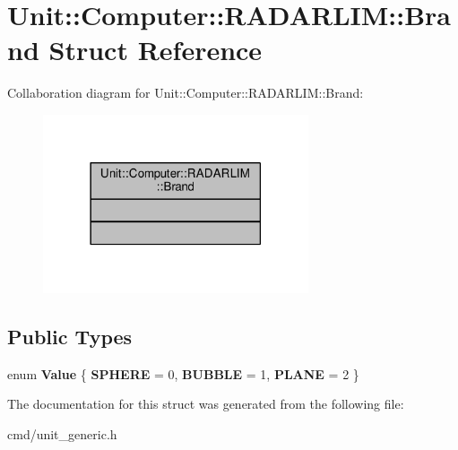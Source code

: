 \hypertarget{structUnit_1_1Computer_1_1RADARLIM_1_1Brand}{}\section{Unit\+:\+:Computer\+:\+:R\+A\+D\+A\+R\+L\+IM\+:\+:Brand Struct Reference}
\label{structUnit_1_1Computer_1_1RADARLIM_1_1Brand}


Collaboration diagram for Unit\+:\+:Computer\+:\+:R\+A\+D\+A\+R\+L\+IM\+:\+:Brand\+:
\nopagebreak
\begin{figure}[H]
\begin{center}
\leavevmode
\includegraphics[width=222pt]{d9/d3e/structUnit_1_1Computer_1_1RADARLIM_1_1Brand__coll__graph}
\end{center}
\end{figure}
\subsection*{Public Types}
\begin{DoxyCompactItemize}
\item 
enum {\bfseries Value} \{ {\bfseries S\+P\+H\+E\+RE} = 0, 
{\bfseries B\+U\+B\+B\+LE} = 1, 
{\bfseries P\+L\+A\+NE} = 2
 \}\hypertarget{structUnit_1_1Computer_1_1RADARLIM_1_1Brand_a019e5de9363c67a8264722ce4a4b2b4a}{}\label{structUnit_1_1Computer_1_1RADARLIM_1_1Brand_a019e5de9363c67a8264722ce4a4b2b4a}

\end{DoxyCompactItemize}


The documentation for this struct was generated from the following file\+:\begin{DoxyCompactItemize}
\item 
cmd/unit\+\_\+generic.\+h\end{DoxyCompactItemize}
